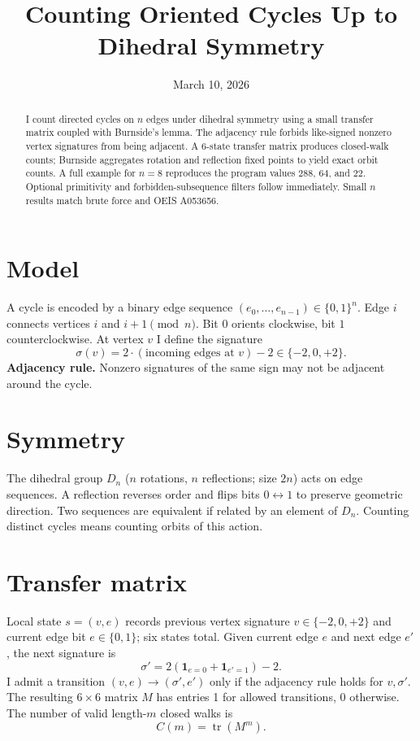 \documentclass[12pt]{article}
\title{Counting Oriented Cycles Up to Dihedral Symmetry}
\author{}
\date{March 10, 2026}
\theoremstyle{definition}
\begin{document}
\maketitle

\begin{abstract}
I count directed cycles on \(n\) edges under dihedral symmetry using a small transfer matrix coupled with Burnside's lemma. The adjacency rule forbids like-signed nonzero vertex signatures from being adjacent. A 6-state transfer matrix produces closed-walk counts; Burnside aggregates rotation and reflection fixed points to yield exact orbit counts. A full example for \(n=8\) reproduces the program values \(288\), \(64\), and \(22\). Optional primitivity and forbidden-subsequence filters follow immediately. Small \(n\) results match brute force and OEIS A053656.
\end{abstract}

\section{Model}
A cycle is encoded by a binary edge sequence \((e_0,\dots,e_{n-1})\in\{0,1\}^n\). Edge \(i\) connects vertices \(i\) and \(i+1\pmod n\). Bit \(0\) orients clockwise, bit \(1\) counterclockwise. At vertex \(v\) I define the signature
\[
\sigma(v)=2\cdot(\text{incoming edges at }v)-2\in\{-2,0,+2\}.
\]
\textbf{Adjacency rule.} Nonzero signatures of the same sign may not be adjacent around the cycle.

\section{Symmetry}
The dihedral group \(D_n\) (\(n\) rotations, \(n\) reflections; size \(2n\)) acts on edge sequences. A reflection reverses order and flips bits \(0\leftrightarrow1\) to preserve geometric direction. Two sequences are equivalent if related by an element of \(D_n\). Counting distinct cycles means counting orbits of this action.

\section{Transfer matrix}
Local state \(s=(v,e)\) records previous vertex signature \(v\in\{-2,0,+2\}\) and current edge bit \(e\in\{0,1\}\); six states total. Given current edge \(e\) and next edge \(e'\), the next signature is
\[
\sigma' = 2(\mathbf{1}_{e=0}+\mathbf{1}_{e'=1})-2.
\]
I admit a transition \((v,e)\to(\sigma',e')\) only if the adjacency rule holds for \(v,\sigma'\). The resulting \(6\times6\) matrix \(M\) has entries 1 for allowed transitions, 0 otherwise. The number of valid length-\(m\) closed walks is
\[
C(m)=\operatorname{tr}(M^m).
\]
\end{document}
